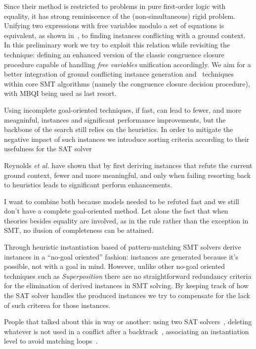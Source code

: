 \message{ !name(main.tex)}\documentclass{easychair}
\begin{document}
Since their method is restricted to problems in pure first-order logic with
equality, it has strong reminiscence of the (non-simultaneous) rigid {\euni}
problem.  Unifying two expressions with free variables modulo a set of equations
is equivalent, as shown in~\cite{Tiwari2000}, to finding instances
conflicting with a ground context.  In this preliminary work we try to exploit
this relation while revisiting the technique: defining an enhanced version of
the classic congruence closure procedure capable of handling \emph{free
  variables} unification accordingly.  We aim for a better integration of ground
conflicting instance generation and {\ematch}~techniques within core SMT
algorithms (namely the congruence closure decision procedure), with MBQI being
used as last resort.

Using incomplete goal-oriented techniques, if fast, can lead to fewer,
and more meagninful, instances and significant performance
improvements, but the backbone of the search still relies on the
heuristics. In order to mitigate the negative impact of such instances
we introduce sorting criteria according to their usefulness for the
SAT solver

Reynolds \emph{et al.} have shown that by first deriving instances
that refute the current ground context, fewer and more meaningful, and
only when failing resorting back to heuristics leads to significant
perform enhancements.

I want to combine both because models needed to be refuted fast and we
still don't have a complete goal-oriented method. Let alone the fact
that when theories besides equality are involved, as in the rule
rather than the exception in SMT, no ilusion of completeness can be
attained.

Through heuristic instantiation based of pattern-matching SMT solvers
derive instances in a ``no-goal oriented'' fashion: instances are
generated because it's possible, not with a goal in mind. However,
unlike other no-goal oriented techniques such as \emph{Superposition}
there are no straightforward redundancy criteria for the elimination
of derived instances in SMT solving. By keeping track of how the SAT
solver handles the produced instances we try to
compensate for the lack of such criterea for those instances.

People that talked about this in way or another: using two SAT solvers~\cite{Leino2005},
deleting whatever is not used in a conflict after a
backtrack~\cite{deMoura2007}, associating an instantiation level to
avoid matching loops~\cite{Ge2007}.
\end{document}
